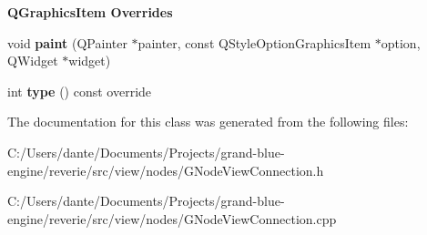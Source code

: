 \begin{Indent}\textbf{ Q\+Graphics\+Item Overrides}\par
\begin{DoxyCompactItemize}
\item 
\mbox{\label{classrev_1_1_view_1_1_node_view_connection_a6328ec64d03d4df4e5d95e8acaff1c94}} 
void {\bfseries paint} (Q\+Painter $\ast$painter, const Q\+Style\+Option\+Graphics\+Item $\ast$option, Q\+Widget $\ast$widget)
\item 
\mbox{\label{classrev_1_1_view_1_1_node_view_connection_a9676e9c984c188f6810e971fea912d3d}} 
int {\bfseries type} () const override
\end{DoxyCompactItemize}
\end{Indent}


The documentation for this class was generated from the following files\+:\begin{DoxyCompactItemize}
\item 
C\+:/\+Users/dante/\+Documents/\+Projects/grand-\/blue-\/engine/reverie/src/view/nodes/G\+Node\+View\+Connection.\+h\item 
C\+:/\+Users/dante/\+Documents/\+Projects/grand-\/blue-\/engine/reverie/src/view/nodes/G\+Node\+View\+Connection.\+cpp\end{DoxyCompactItemize}
